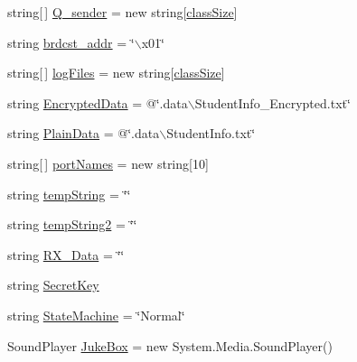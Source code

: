 \begin{DoxyCompactItemize}
string\mbox{[}$\,$\mbox{]} \hyperlink{class_sr_p___classroom_inq_1_1frm_classrrom_inq_afa4b6c4601d48db676d4013daef6624c}{\-Q\-\_\-sender} = new string\mbox{[}\hyperlink{class_sr_p___classroom_inq_1_1frm_classrrom_inq_a78d9aab335edfe53d39036b9d89928a8}{class\-Size}\mbox{]}
\item 
string \hyperlink{class_sr_p___classroom_inq_1_1frm_classrrom_inq_a1d96e40e37aca536a94b7107df4a2d71}{brdcst\-\_\-addr} = \char`\"{}$\backslash$x01\char`\"{}
\item 
string\mbox{[}$\,$\mbox{]} \hyperlink{class_sr_p___classroom_inq_1_1frm_classrrom_inq_a1b23b6935997df29f1b06ed831495076}{log\-Files} = new string\mbox{[}\hyperlink{class_sr_p___classroom_inq_1_1frm_classrrom_inq_a78d9aab335edfe53d39036b9d89928a8}{class\-Size}\mbox{]}
\item 
string \hyperlink{class_sr_p___classroom_inq_1_1frm_classrrom_inq_a3128c84ccd476a8a2e02bedab0ecc031}{\-Encrypted\-Data} = @\char`\"{}.data$\backslash$\-Student\-Info\-\_\-\-Encrypted.\-txt\char`\"{}
\item 
string \hyperlink{class_sr_p___classroom_inq_1_1frm_classrrom_inq_a511d08cf3bdc5282be448f0513bbd262}{\-Plain\-Data} = @\char`\"{}.data$\backslash$\-Student\-Info.\-txt\char`\"{}
\item 
string\mbox{[}$\,$\mbox{]} \hyperlink{class_sr_p___classroom_inq_1_1frm_classrrom_inq_a9c5b06a44069e68e732d7bcd7a8fa08c}{port\-Names} = new string\mbox{[}10\mbox{]}
\item 
string \hyperlink{class_sr_p___classroom_inq_1_1frm_classrrom_inq_aaad277eaea17731f132fb18aa3560a91}{temp\-String} = \char`\"{}\char`\"{}
\item 
string \hyperlink{class_sr_p___classroom_inq_1_1frm_classrrom_inq_a4ebaa0f6e4e9f61300c6aae855fc8fc1}{temp\-String2} = \char`\"{}\char`\"{}
\item 
string \hyperlink{class_sr_p___classroom_inq_1_1frm_classrrom_inq_ab11c567168df8023b691c4adf4a149ad}{\-R\-X\-\_\-\-Data} = \char`\"{}\char`\"{}
\item 
string \hyperlink{class_sr_p___classroom_inq_1_1frm_classrrom_inq_ae3ddacd233e71c710d89e12401af37c1}{\-Secret\-Key}
\item 
string \hyperlink{class_sr_p___classroom_inq_1_1frm_classrrom_inq_a4858c67d60a267f02e6c97085f2aee71}{\-State\-Machine} = \char`\"{}\-Normal\char`\"{}
\item 
\-Sound\-Player \hyperlink{class_sr_p___classroom_inq_1_1frm_classrrom_inq_a10f0b7ba2800c1353aeee71344d08a94}{\-Juke\-Box} = new \-System.\-Media.\-Sound\-Player()

\end{DoxyCompactItemize}
